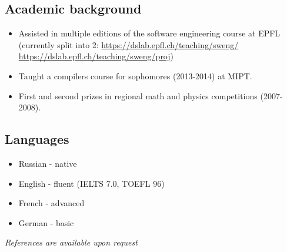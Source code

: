 \documentclass[letterpaper]{resume}
\begin{document}
\subsection{Academic background}
\begin{itemize}
  \item Assisted in multiple editions of the software engineering course at EPFL
    (currently split into 2: \url{https://dslab.epfl.ch/teaching/sweng/} \url{https://dslab.epfl.ch/teaching/sweng/proj})
  \item Taught a compilers course for sophomores (2013-2014) at MIPT.
  \item First and second prizes in regional math and physics competitions (2007-2008).
\end{itemize}

\subsection{Languages}
\begin{itemize}
    \item Russian - native
    \item English - fluent (IELTS 7.0, TOEFL 96)
    \item French - advanced
    \item German - basic
\end{itemize}


\emph{References are available upon request} 
\end{document}
